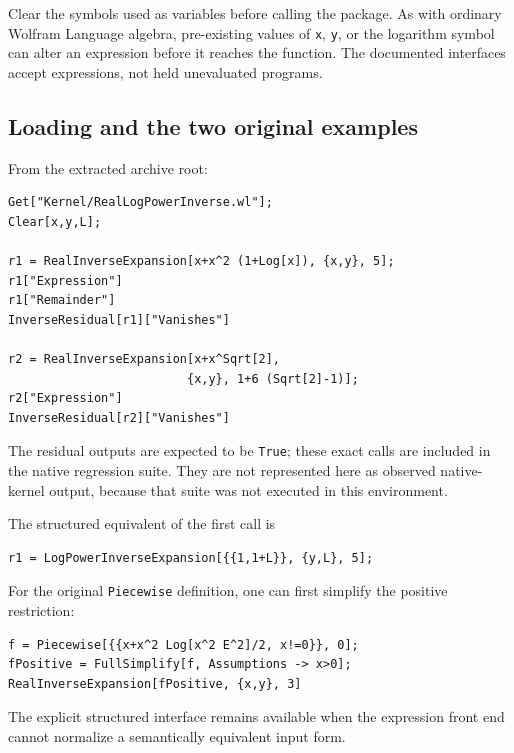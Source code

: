 \documentclass[11pt,a4paper]{article}
\theoremstyle{definition}
\begin{document}
Clear the symbols used as variables before calling the package. As with
ordinary Wolfram Language algebra, pre-existing values of \texttt{x},
\texttt{y}, or the logarithm symbol can alter an expression before it reaches
the function. The documented interfaces accept expressions, not held
unevaluated programs.

\subsection{Loading and the two original examples}
From the extracted archive root:
\begin{lstlisting}
Get["Kernel/RealLogPowerInverse.wl"];
Clear[x,y,L];

r1 = RealInverseExpansion[x+x^2 (1+Log[x]), {x,y}, 5];
r1["Expression"]
r1["Remainder"]
InverseResidual[r1]["Vanishes"]

r2 = RealInverseExpansion[x+x^Sqrt[2],
                         {x,y}, 1+6 (Sqrt[2]-1)];
r2["Expression"]
InverseResidual[r2]["Vanishes"]
\end{lstlisting}
The residual outputs are expected to be \texttt{True}; these exact calls are
included in the native regression suite. They are not represented here as
observed native-kernel output, because that suite was not executed in this
environment.

The structured equivalent of the first call is
\begin{lstlisting}
r1 = LogPowerInverseExpansion[{{1,1+L}}, {y,L}, 5];
\end{lstlisting}
For the original \texttt{Piecewise} definition, one can first simplify the
positive restriction:
\begin{lstlisting}
f = Piecewise[{{x+x^2 Log[x^2 E^2]/2, x!=0}}, 0];
fPositive = FullSimplify[f, Assumptions -> x>0];
RealInverseExpansion[fPositive, {x,y}, 3]
\end{lstlisting}
The explicit structured interface remains available when the expression
front end cannot normalize a semantically equivalent input form.
\end{document}
